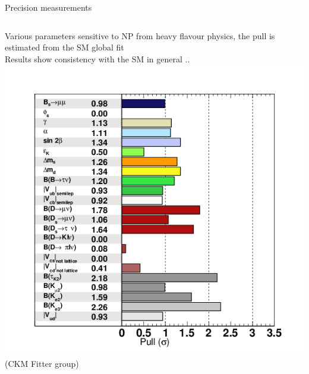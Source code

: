 \documentclass[9pt,usenames,dvipsnames]{beamer}
\begin{document}
\begin{frame}{Precision measurements}
	\begin{columns}[c]
		Various parameters sensitive to NP from heavy flavour physics, the pull is estimated from the SM global fit\\ Results show consistency with the SM in general ..
		\centering
		\includegraphics[width= \textwidth]{./assets/Pulls}\\ (CKM Fitter group)
	\end{columns}
\end{frame}
\end{document}
